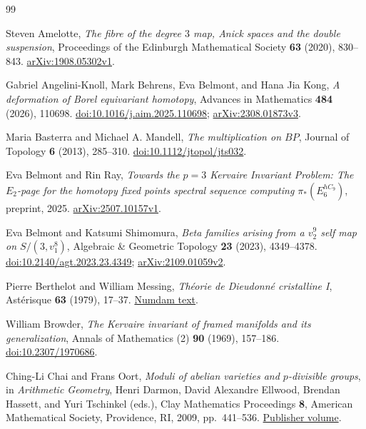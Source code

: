 \begin{thebibliography}{99}

Steven Amelotte,
\emph{The fibre of the degree $3$ map, Anick spaces and the double suspension},
Proceedings of the Edinburgh Mathematical Society \textbf{63} (2020),
830--843.
\href{https://arxiv.org/abs/1908.05302v1}{arXiv:1908.05302v1}.

Gabriel Angelini-Knoll, Mark Behrens, Eva Belmont, and Hana Jia Kong,
\emph{A deformation of Borel equivariant homotopy},
Advances in Mathematics \textbf{484} (2026), 110698.
\href{https://doi.org/10.1016/j.aim.2025.110698}{doi:10.1016/j.aim.2025.110698};
\href{https://arxiv.org/abs/2308.01873v3}{arXiv:2308.01873v3}.

Maria Basterra and Michael A. Mandell,
\emph{The multiplication on $BP$},
Journal of Topology \textbf{6} (2013), 285--310.
\href{https://doi.org/10.1112/jtopol/jts032}{doi:10.1112/jtopol/jts032}.

Eva Belmont and Rin Ray,
\emph{Towards the $p=3$ Kervaire Invariant Problem:
The $E_2$-page for the homotopy fixed points spectral sequence computing
$\pi_*(E_6^{hC_9})$},
preprint, 2025.
\href{https://arxiv.org/abs/2507.10157v1}{arXiv:2507.10157v1}.

Eva Belmont and Katsumi Shimomura,
\emph{Beta families arising from a $v_2^9$ self map on $S/(3,v_1^8)$},
Algebraic \& Geometric Topology \textbf{23} (2023), 4349--4378.
\href{https://doi.org/10.2140/agt.2023.23.4349}{doi:10.2140/agt.2023.23.4349};
\href{https://arxiv.org/abs/2109.01059v2}{arXiv:2109.01059v2}.

Pierre Berthelot and William Messing,
\emph{Th\'eorie de Dieudonn\'e cristalline I},
Ast\'erisque \textbf{63} (1979), 17--37.
\href{https://www.numdam.org/item/AST_1979__63__17_0/}{Numdam text}.

William Browder,
\emph{The Kervaire invariant of framed manifolds and its generalization},
Annals of Mathematics (2) \textbf{90} (1969), 157--186.
\href{https://doi.org/10.2307/1970686}{doi:10.2307/1970686}.

Ching-Li Chai and Frans Oort,
\emph{Moduli of abelian varieties and $p$-divisible groups},
in \emph{Arithmetic Geometry},
Henri Darmon, David Alexandre Ellwood, Brendan Hassett,
and Yuri Tschinkel (eds.),
Clay Mathematics Proceedings \textbf{8},
American Mathematical Society, Providence, RI, 2009, pp.~441--536.
\href{https://www.claymath.org/library/proceedings/cmip08c.pdf}{Publisher volume}.


\end{thebibliography}
